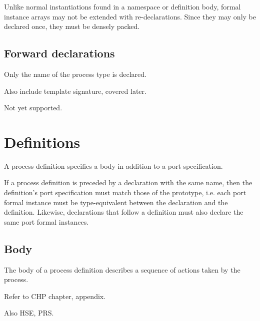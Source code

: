 Unlike normal instantiations found in a namespace or definition body, 
formal instance arrays may not be extended with re-declarations.  
Since they may only be declared once, they must be densely packed.  

\subsection{Forward declarations}
\label{sec:process:declarations:forward}

Only the name of the process type is declared.  

Also include template signature, covered later.  

Not yet supported.  

\section{Definitions}
\label{sec:process:definitions}

A process definition specifies a body in addition to a port specification.  

If a process definition is preceded by a declaration with the same name, 
then the definition's port specification must match those of the prototype, 
i.e. each port formal instance must be type-equivalent between the 
declaration and the definition.  
Likewise, declarations that follow a definition must also 
declare the same port formal instances.  


\subsection{Body}
\label{sec:process:definitions:body}

The body of a process definition describes a sequence of actions
taken by the process.  

Refer to CHP chapter, appendix.  

Also HSE, PRS.  


